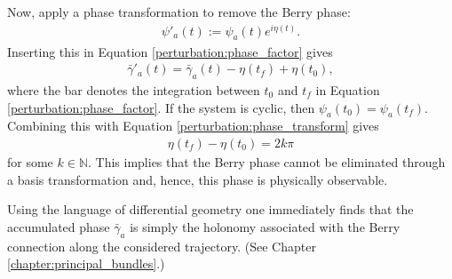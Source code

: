     Now, apply a phase transformation to remove the Berry phase:
    \begin{gather}
        \label{perturbation:phase_transform}
        \psi'_a(t) := \psi_a(t)e^{i\eta(t)}.
    \end{gather}
    Inserting this in Equation \eqref{perturbation:phase_factor} gives
    \begin{gather}
        \bar\gamma'_a(t) = \bar\gamma_a(t) - \eta(t_f) + \eta(t_0),
    \end{gather}
    where the bar denotes the integration between $t_0$ and $t_f$ in Equation \eqref{perturbation:phase_factor}. If the system is cyclic, then $\psi_a(t_0) = \psi_a(t_f)$. Combining this with Equation \eqref{perturbation:phase_transform} gives
    \begin{gather}
        \eta(t_f) - \eta(t_0) = 2k\pi
    \end{gather}
    for some $k\in\mathbb{N}$. This implies that the Berry phase cannot be eliminated through a basis transformation and, hence, this phase is physically observable.

    \begin{remark}[$\clubsuit$]
        Using the language of differential geometry one immediately finds that the accumulated phase $\bar\gamma_a$ is simply the holonomy associated with the Berry connection along the considered trajectory. (See Chapter \ref{chapter:principal_bundles}.)
    \end{remark}
